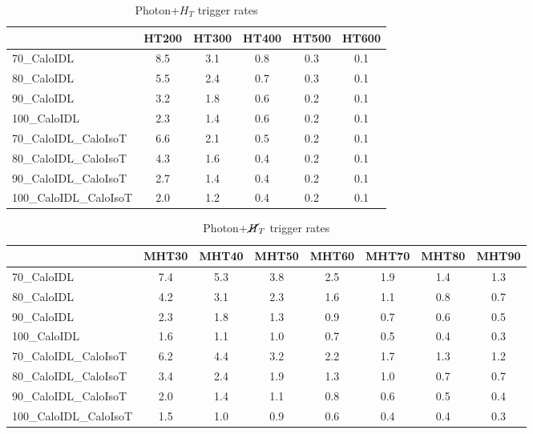 \begin{table}
\begin{center}
\begin{tabular}{|l|ccccc|}\hline
         & HT200 & HT300 & HT400 & HT500 & HT600 \\ \hline \hline
70\_CaloIDL & 8.5 & 3.1 & 0.8 & 0.3 & 0.1 \\
80\_CaloIDL & 5.5 & 2.4 & 0.7 & 0.3 & 0.1 \\
90\_CaloIDL & 3.2 & 1.8 & 0.6 & 0.2 & 0.1 \\
100\_CaloIDL & 2.3 & 1.4 & 0.6 & 0.2 & 0.1 \\ \hline
70\_CaloIDL\_CaloIsoT & 6.6 & 2.1 & 0.5 & 0.2 & 0.1 \\
80\_CaloIDL\_CaloIsoT & 4.3 & 1.6 & 0.4 & 0.2 & 0.1 \\
90\_CaloIDL\_CaloIsoT & 2.7 & 1.4 & 0.4 & 0.2 & 0.1 \\
100\_CaloIDL\_CaloIsoT & 2.0 & 1.2 & 0.4 & 0.2 & 0.1 \\ \hline
\end{tabular}
\end{center}
\caption{Photon+$H_T$ trigger rates}
\end{table}


\begin{table}
\begin{center}
\begin{tabular}{|l|ccccccc|}\hline
         & MHT30 & MHT40 & MHT50 & MHT60 & MHT70 & MHT80 & MHT90 \\ \hline \hline
70\_CaloIDL & 7.4 & 5.3 & 3.8 & 2.5 & 1.9 & 1.4 & 1.3  \\
80\_CaloIDL & 4.2 & 3.1 & 2.3 & 1.6 & 1.1 & 0.8 & 0.7 \\
90\_CaloIDL & 2.3 & 1.8 & 1.3 & 0.9 & 0.7 & 0.6 & 0.5 \\
100\_CaloIDL & 1.6 & 1.1 & 1.0 & 0.7 & 0.5 & 0.4 & 0.3 \\ \hline
70\_CaloIDL\_CaloIsoT & 6.2 & 4.4 & 3.2 & 2.2 & 1.7 & 1.3 & 1.2 \\
80\_CaloIDL\_CaloIsoT & 3.4 & 2.4 & 1.9 & 1.3 & 1.0 & 0.7 & 0.7 \\
90\_CaloIDL\_CaloIsoT & 2.0 & 1.4 & 1.1 & 0.8 & 0.6 & 0.5 & 0.4 \\
100\_CaloIDL\_CaloIsoT & 1.5 & 1.0 & 0.9 & 0.6 & 0.4 & 0.4 & 0.3 \\ \hline
\end{tabular}
\end{center}
\caption{Photon+$\cancel{H}_T$ trigger rates}
\end{table}


